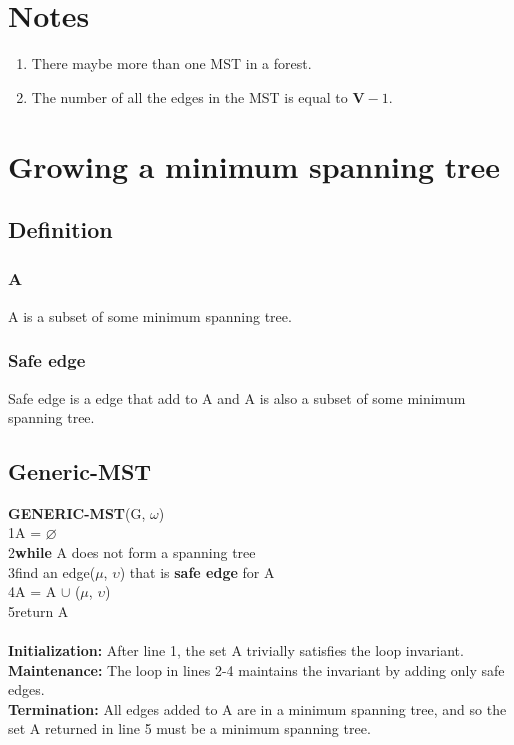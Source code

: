 \section {Notes}

\begin{enumerate}[label=(\roman*)]
\item There maybe more than one MST in a forest.
\item The number of all the edges in the MST is equal to $\boldsymbol{V} - 1$.
\end{enumerate}

\section {Growing a minimum spanning tree}

\subsection {Definition}

\subsubsection {A}
A is a subset of some minimum spanning tree.  

\subsubsection {Safe edge}
Safe edge is a edge that add to A and A is also a subset of some minimum
spanning tree.

\subsection {Generic-MST}

\textbf{GENERIC-MST}(G, $\omega$)\\
1\space A = $\varnothing$\\
2\space \textbf{while} A does not form a spanning tree\\
3\space\space\space\space find an edge($\mu$, $\upsilon$) that is
\textbf{safe edge} for A\\
4\space\space\space\space A = A $\cup$ {($\mu$, $\upsilon$)}\\
5\space return A\\
\\
\textbf{Initialization:} After line 1, the set A trivially satisfies the loop
invariant.\\
\textbf{Maintenance:} The loop in lines 2-4 maintains the invariant by adding
only safe edges.\\
\textbf{Termination:} All edges added to A are in a minimum spanning tree, and
so the set A returned in line 5 must be a minimum spanning tree.

